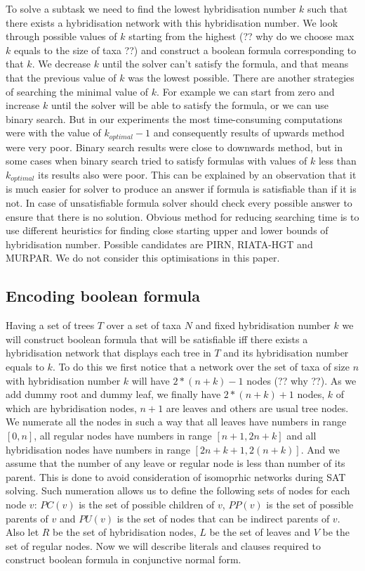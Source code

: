 \documentclass[runningheads, envcountsame, a4paper]{llncs}
\begin{document}
To solve a subtask we need to find the lowest hybridisation number $k$ such that there exists a hybridisation 
network with this hybridisation number. We look through possible values of $k$ starting from the highest (?? why do 
we choose max $k$ equals to the size of taxa ??) and construct a boolean formula corresponding to that $k$. 
We decrease $k$ until the solver can't satisfy the formula, and that means that the previous value of $k$ was the 
lowest possible. There are another strategies of searching the minimal value of $k$. For example we can start from 
zero and increase $k$ until the solver will be able to satisfy the formula, or we can use binary search. But in our 
experiments the most time-consuming computations were with the value of $k_{optimal} - 1$ and consequently results of 
upwards method were very poor. Binary search results were close to downwards method, but in some cases when binary search 
tried to satisfy formulas with values of $k$ less than $k_{optimal}$ its results also were poor. This can be explained by 
an observation that it is much easier for solver to produce an answer if formula is satisfiable than if it is not. In case 
of unsatisfiable formula solver should check every possible answer to ensure that there is no solution. Obvious method 
for reducing searching time is to use different heuristics for finding close starting upper and lower bounds of 
hybridisation number. Possible candidates are PIRN, RIATA-HGT and MURPAR. We do not consider this optimisations in this paper.

\subsection{Encoding boolean formula}

Having a set of trees $T$ over a set of taxa $N$ and fixed hybridisation number $k$ we will construct boolean formula 
that will be satisfiable iff there exists a hybridisation network that displays each tree in $T$ and its hybridisation 
number equals to $k$. To do this we first notice that a network over the set of taxa of size $n$ with hybridisation number 
$k$ will have $2 * (n + k) - 1$ nodes (?? why ??). As we add dummy root and dummy leaf, we finally have $2 * (n + k) + 1$ nodes, 
$k$ of which are hybridisation nodes, $n + 1$ are leaves and others are usual tree nodes. We numerate all the nodes in such a way 
that all leaves have numbers in range $[0,n]$, all regular nodes have numbers in range $[n + 1,2n + k]$ and all hybridisation nodes have numbers 
in range $[2n + k + 1, 2(n + k)]$. And we assume that the number of any leave or regular node is less than number of its parent. This is done to 
avoid consideration of isomoprhic networks during SAT solving. Such numeration allows us to define the following sets of nodes for each node 
$v$: $PC(v)$ is the set of possible children of $v$, $PP(v)$ is the set of possible parents of $v$ and $PU(v)$ is the set of nodes that can 
be indirect parents of $v$. Also let $R$ be the set of hybridisation nodes, $L$ be the set of leaves and $V$ be the set of regular nodes. 
Now we will describe literals and clauses required to construct boolean formula in conjunctive normal form.
\end{document}
